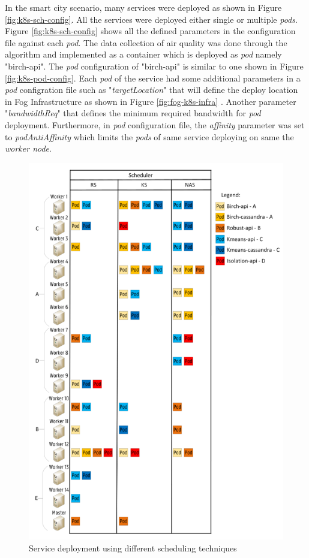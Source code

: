 In the smart city scenario, many services were deployed as shown in Figure \ref{fig:k8s-sch-config}. All the services were deployed either single or multiple \emph{pods}. Figure \ref{fig:k8s-sch-config} shows all the defined parameters in the configuration file against each \emph{pod}. The data collection of air quality was done through the algorithm and implemented as a container which is deployed as \emph{pod} namely "birch-api"\cite{Santos2019}. The \emph{pod} configuration of "birch-api" is similar to one shown in Figure \ref{fig:k8s-pod-config}. Each \emph{pod} of the service  had some additional parameters in a \emph{pod} configration file such as "\emph{targetLocation}" that will define the deploy location in Fog Infrastructure as shown in Figure \ref{fig:fog-k8s-infra} \cite{Santos2019}. Another parameter "\emph{bandwidthReq}" that defines the minimum required bandwidth for \emph{pod} deployment\cite{Santos2019}. Furthermore, in \emph{pod} configuration file, the \emph{affinity} parameter was set to \emph{podAntiAffinity} which limits the \emph{pods} of same service deploying on same the \emph{worker node}\cite{Santos2019}.
\begin{figure}
  \centering
  \includegraphics[width=\linewidth]{figures/mlcn-k8s-service-prov.pdf}
  \caption{Service deployment using different scheduling techniques\cite{Santos2019}}
  \label{fig:k8s-service}
\end{figure}
